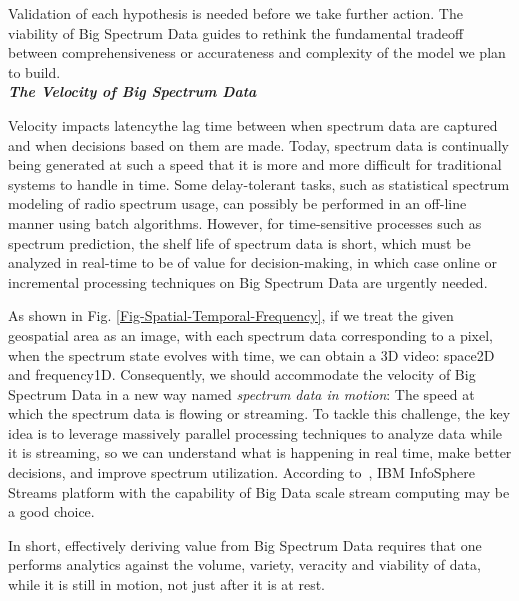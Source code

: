 \documentclass[12pt,draftcls,journal,letterpaper,oneside,onecolumn]{IEEEtran}
\begin{document}
Validation of each hypothesis is needed before we take further action. The viability of Big Spectrum Data guides to rethink the fundamental tradeoff between comprehensiveness or accurateness and complexity of the model we plan to build.
\\





\textbf{\emph{The Velocity of Big Spectrum Data}}

Velocity impacts latencythe lag time between when spectrum data are captured and when decisions based on them are made. Today, spectrum data is continually being generated at such a speed that it is more and more difficult for traditional systems to handle in time. Some delay-tolerant tasks, such as statistical spectrum modeling of radio spectrum usage, can possibly be performed in an off-line manner using batch algorithms. However, for time-sensitive processes such as spectrum prediction, the shelf life of spectrum data is short, which must be analyzed in real-time to be of value for decision-making, in which case online or incremental processing techniques on Big Spectrum Data are urgently needed.

As shown in Fig. \ref{Fig-Spatial-Temporal-Frequency}, if we treat the given geospatial area as an image, with each spectrum data corresponding to a pixel, when the spectrum state evolves with time, we can obtain a 3D video: space2D and frequency1D. Consequently, we should accommodate the velocity of Big Spectrum Data in a new way named \emph{spectrum data in motion}: The speed at which the spectrum data is flowing or streaming. To tackle this challenge, the key idea is to leverage massively parallel processing techniques to analyze data while it is streaming, so we can understand what is happening in real time, make better decisions, and improve spectrum utilization. According to~\cite{Understanding-Big-Data}, IBM InfoSphere Streams platform with the capability of Big Data scale stream computing may be a good choice.







In short, effectively deriving value from Big Spectrum Data requires that one performs analytics against the volume, variety, veracity and viability of data, while it is still in motion, not just after it is at rest.
\\
\end{document}
